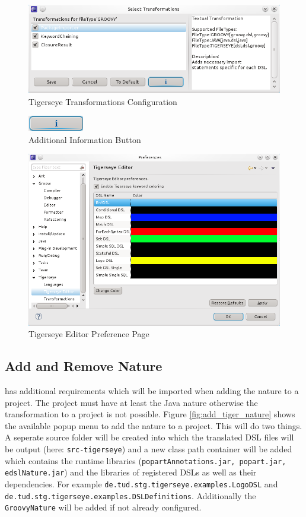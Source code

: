 	\begin{figure}
	  \centering
	  \includegraphics[width=.5\textwidth,keepaspectratio=true]{../pics/preferences_transformations_selected.png}
	  \caption{Tigerseye Transformations Configuration}
	  \label{fig:prefs_transformations_selected}
	\end{figure}

	\begin{figure}
	  \centering
	  \includegraphics{../pics/additional_information_button.png}
	  \caption{Additional Information Button}
	  \label{fig:additional_information_button}
	\end{figure}

	\begin{figure}
	  \centering
	  \includegraphics[width=.5\textwidth,keepaspectratio=true]{../pics/preferences_editor.png}
	  \caption{Tigerseye Editor Preference Page}
	  \label{fig:prefs_editor}
	\end{figure}

	\subsection{Add and Remove \tiger Nature}
	  \tiger has additional requirements which will be imported when adding the \tiger nature to a project. The project must have at least the Java nature otherwise the transformation to a \tiger project is not possible. Figure \ref{fig:add_tiger_nature} shows the available popup menu to add the \tiger nature to a project. This will do two things. A seperate source folder will be created into which the translated DSL files will be output (here: \texttt{src-tigerseye}) and a new class path container will be added which contains the runtime libraries (\texttt{popartAnnotations.jar, popart.jar, edslNature.jar}) and the libraries of registered DSLs as well as their dependencies. For example \texttt{de.tud.stg.tigerseye.examples.LogoDSL} and \texttt{de.tud.stg.tigerseye.examples.DSLDefinitions}. Additionally the \texttt{GroovyNature} will be added if not already configured.
	
